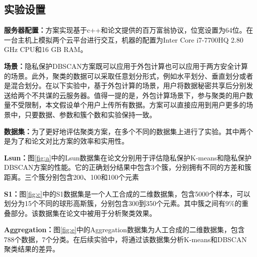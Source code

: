 \subsection{实验设置}
\textbf{服务器配置：}方案实现基于c++和论文\cite{rathee2020cryptflow2}提供的百万富翁协议，位宽设置为64位。在一台主机上模拟两个云平台进行交互，机器的配置为Inter Core i7-7700HQ 2.80 GHz CPU和16 GB RAM。

\textbf{场景：}隐私保护DBSCAN方案既可以应用于外包计算也可以应用于两方安全计算的场景。此外，聚类的数据可以采取任意划分形式，例如水平划分、垂直划分或者是混合划分。在以下实验中，基于外包计算的场景，用户将数据秘密共享后分别发送给两个不共谋的云服务器。值得一提的是，外包计算场景下，参与聚类的用户数量不受限制，本文假设单个用户上传所有数据。方案可以直接应用到用户更多的场景中，只要数据、参数和簇个数和实验保持一致。

\textbf{数据集：}为了更好地评估聚类方案，在多个不同的数据集上进行了实验。其中两个是为了和论文\cite{bozdemir2021privacy}对比方案的效率和实用性。

\begin{compactitem}
	\item \textbf{Lsun：}图\ref{fig:a}中的Lsun数据集\cite{ultsch2005clustering}在论文\cite{wu2020secure,bozdemir2021privacy}分别用于评估隐私保护K-means和隐私保护DBSCAN方案的性能。它的正确划分结果中包含3个簇，分别拥有不同的方差和簇距离。三个簇分别包含200、100和100个元素
	\item
	\textbf{S1：}图\ref{fig:c}中的S1\cite{franti2018k}数据集是一个人工合成的二维数据集，包含5000个样本，可以划分为15个不同的球形高斯簇，分别包含300到350个元素。其中簇之间有9\%的重叠部分。该数据集在论文\cite{bozdemir2021privacy,mohassel2019practical,su2007privacy}中被用于分析聚类效果。
	\item
	\textbf{Aggregation：}图\ref{fig:e}中的Aggregation数据集\cite{gionis2007clustering}为人工合成的二维数据集，包含788个数据，7个分类。在后续实验中，将通过该数据集分析K-means和DBSCAN聚类结果的差异。
\end{compactitem}

